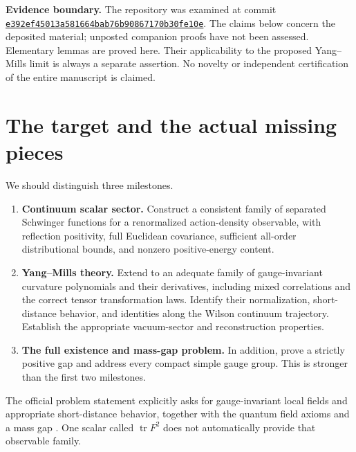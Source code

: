 \documentclass[11pt]{article}
\theoremstyle{remark}
\newcommand{\tr}{\operatorname{tr}}
\begin{document}
\noindent\textbf{Evidence boundary.}
The repository was examined at commit
\href{https://github.com/ethanwsussman/Yang--Mills-LLM-experiment/tree/e392ef45013a581664bab76b90867170b30fe10e}
{\texttt{e392ef45013a581664bab76b90867170b30fe10e}}.
The claims below concern the deposited material; unposted companion proofs
have not been assessed. Elementary lemmas are proved here. Their applicability
to the proposed Yang--Mills limit is always a separate assertion.
No novelty or independent certification of the entire manuscript is claimed.

\section{The target and the actual missing pieces}

We should distinguish three milestones.
\begin{enumerate}
\item \textbf{Continuum scalar sector.}
Construct a consistent family of separated Schwinger functions for a
renormalized action-density observable, with reflection positivity, full
Euclidean covariance, sufficient all-order distributional bounds, and
nonzero positive-energy content.
\item \textbf{Yang--Mills theory.}
Extend to an adequate family of gauge-invariant curvature polynomials and
their derivatives, including mixed correlations and the correct tensor
transformation laws. Identify their normalization, short-distance behavior,
and identities along the Wilson continuum trajectory. Establish the
appropriate vacuum-sector and reconstruction properties.
\item \textbf{The full existence and mass-gap problem.}
In addition, prove a strictly positive gap and address every compact simple
gauge group. This is stronger than the first two milestones.
\end{enumerate}
The official problem statement explicitly asks for gauge-invariant local
fields and appropriate short-distance behavior, together with the quantum
field axioms and a mass gap \cite{clay}. One scalar called
$\tr F^2$ does not automatically provide that observable family.
\end{document}
